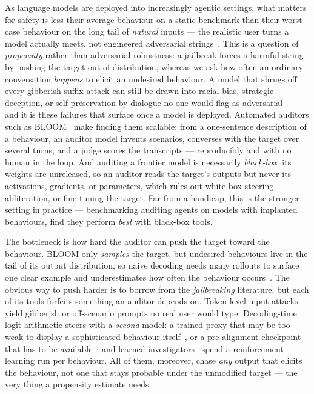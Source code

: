 \documentclass{article}
\theoremstyle{plain}
\theoremstyle{definition}
\theoremstyle{remark}
\begin{document}
As language models are deployed into increasingly agentic settings, what matters for safety is less their average behaviour on a static benchmark than their worst-case behaviour on the long tail of \emph{natural} inputs --- the realistic user turns a model actually meets, not engineered adversarial strings~\citep{jones2025forecasting}.
This is a question of \emph{propensity} rather than adversarial robustness: a jailbreak forces a harmful string by pushing the target out of distribution, whereas we ask how often an ordinary conversation \emph{happens} to elicit an undesired behaviour.
A model that shrugs off every gibberish-suffix attack can still be drawn into racial bias, strategic deception, or self-preservation by dialogue no one would flag as adversarial --- and it is these failures that surface once a model is deployed.
Automated auditors such as BLOOM~\citep{gupta2025bloom} make finding them scalable: from a one-sentence description of a behaviour, an auditor model invents scenarios, converses with the target over several turns, and a judge scores the transcripts --- reproducibly and with no human in the loop.
And auditing a frontier model is necessarily \emph{black-box}: its weights are unreleased, so an auditor reads the target's outputs but never its activations, gradients, or parameters, which rules out white-box steering, abliteration, or fine-tuning the target.
Far from a handicap, this is the stronger setting in practice --- benchmarking auditing agents on models with implanted behaviours, \citet{sheshadri2026auditbench} find they perform \emph{best} with black-box tools.

The bottleneck is how hard the auditor can push the target toward the behaviour.
BLOOM only \emph{samples} the target, but undesired behaviours live in the tail of its output distribution, so naive decoding needs many rollouts to surface one clear example and underestimates how often the behaviour occurs~\citep{beyer2026sampling,wu2024rare}.
The obvious way to push harder is to borrow from the \emph{jailbreaking} literature, but each of its tools forfeits something an auditor depends on.
Token-level input attacks~\citep{zou2023universal,sadasivan2024fast} yield gibberish or off-scenario prompts no real user would type.
Decoding-time logit arithmetic steers with a \emph{second} model: a trained proxy that may be too weak to display a sophisticated behaviour itself~\citep{zhao2024weak,liu2024proxy}, or a pre-alignment checkpoint that has to be available~\citep{aranguri2025diffamp,zhou2024emulated}; and learned investigators~\citep{chowdhury2025pathological} spend a reinforcement-learning run per behaviour.
All of them, moreover, chase \emph{any} output that elicits the behaviour, not one that stays probable under the unmodified target --- the very thing a propensity estimate needs.
\end{document}
